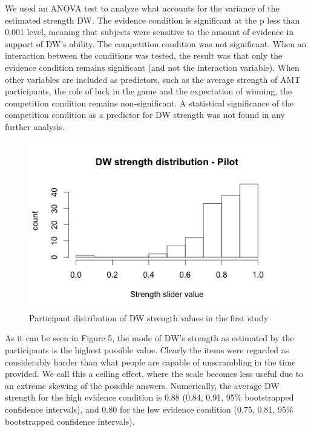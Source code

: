 \documentclass{article}
\begin{document}
We used an ANOVA test to analyze what accounts for the variance of the estimated strength DW. The evidence condition is significant at the p less than 0.001 level, meaning that subjects were sensitive to the amount of evidence in support of DW's ability. The competition condition was not significant. When an interaction between the conditions was tested, the result was that only the evidence condition remains significant (and not the interaction variable). When other variables are included as predictors, such as the average strength of AMT participants, the role of luck in the game and the expectation of winning, the competition condition remains non-significant. A statistical significance of the competition condition as a predictor for DW strength was not found in any further analysis.

\begin{figure}
\centering
    \includegraphics[width=\columnwidth]{DW_strength_pilot}
    \caption{Participant distribution of DW strength values in the first study}
      \label{fig:DW_strength_pilot}
\end{figure}

As it can be seen in Figure 5, the mode of DW's strength as estimated by the participants is the highest possible value. Clearly the items were regarded as considerably harder than what people are capable of unscrambling in the time provided. We call this a ceiling effect, where the scale becomes less useful due to an extreme skewing of the possible answers. Numerically, the average DW strength for the high evidence condition is 0.88 (0.84, 0.91, 95\% bootstrapped confidence intervals), and 0.80 for the low evidence condition (0.75, 0.81, 95\% bootstrapped confidence intervals).
\end{document}
